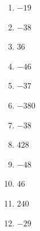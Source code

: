 %
%
    \begin{enumerate}[cols=4]
        \item \(-19\)
        \item \(-38\)
        \item \(36\)
        \item \(-46\)
        \item \(-37\)
        \item \(-380\)
        \item \(-38\)
        \item \(428\)
        \item \(-48\)
        \item \(46\)
        \item \(240\)
        \item \(-29\)
    \end{enumerate}
